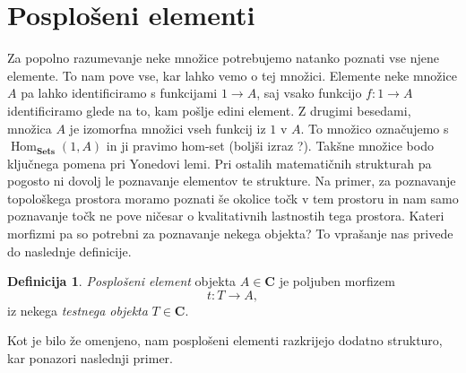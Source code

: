 \documentclass[12pt,a4paper]{book}
\theoremstyle{definition}
\newtheorem{definicija}{Definicija}[chapter]
\theoremstyle{plain}
\theoremstyle{definition}
\theoremstyle{remark}
\newcommand{\cat}[1]{\textbf{#1}}
\DeclareMathOperator{\Hom}{Hom}
\begin{document}
\section{Posplošeni elementi}
Za popolno razumevanje neke množice potrebujemo natanko poznati vse njene elemente. To nam pove vse, kar lahko vemo o tej množici. Elemente neke množice $A$ pa lahko identificiramo s funkcijami $1 \to A$, saj vsako funkcijo $f : 1 \to A$ identificiramo glede na to, kam pošlje edini element. Z drugimi besedami, množica $A$ je izomorfna množici vseh funkcij iz $1$ v $A$. To množico označujemo s $\Hom_{\cat{Sets}}(1,A)$ in ji pravimo hom-set (boljši izraz ?). Takšne množice bodo ključnega pomena pri Yonedovi lemi.
Pri ostalih matematičnih strukturah pa pogosto ni dovolj le poznavanje elementov te strukture. Na primer, za poznavanje topološkega prostora moramo poznati še okolice točk v tem prostoru in nam samo poznavanje točk ne pove ničesar o kvalitativnih lastnostih tega prostora. Kateri morfizmi pa so potrebni za poznavanje nekega objekta? To vprašanje nas privede do naslednje definicije.

\begin{definicija}
\emph{Posplošeni element} objekta $A \in \cat{C}$ je poljuben morfizem 
$$t : T \to A,$$
iz nekega \emph{testnega objekta} $T \in \cat{C}$.
\end{definicija}
Kot je bilo že omenjeno, nam posplošeni elementi razkrijejo dodatno strukturo, kar ponazori naslednji primer.
\end{document}
